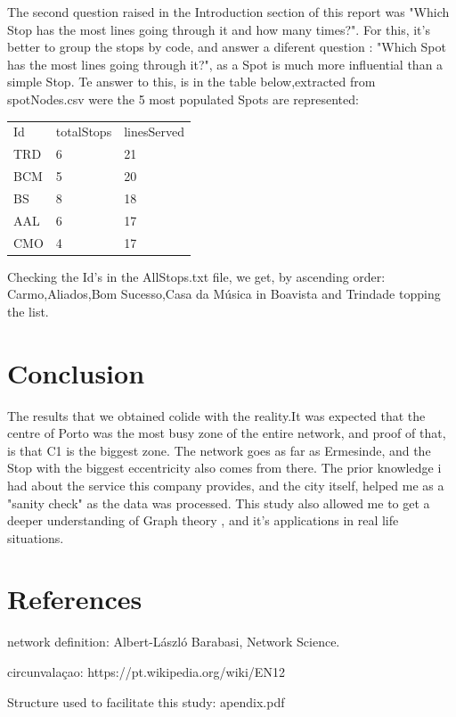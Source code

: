 \documentclass[12pt]{article}
\begin{document}
The second question raised in the Introduction section of this report was "Which Stop has the most lines going through it and how many times?". For this, it's better to group the stops by code, and answer a diferent question : "Which Spot has the most lines going through it?", as a Spot is much more influential than a simple Stop. Te answer to this, is in the table below,extracted from spotNodes.csv were the 5 most populated Spots are represented:

\begin{table}[]
\centering
\begin{tabular}{lll}
Id  & totalStops & linesServed \\
TRD & 6          & 21          \\
BCM & 5          & 20          \\
BS  & 8          & 18          \\
AAL & 6          & 17          \\
CMO & 4          & 17         
\end{tabular}
\end{table}

Checking the Id's in the AllStops.txt file, we get, by ascending order:
Carmo,Aliados,Bom Sucesso,Casa da Música in Boavista and Trindade topping the list.

\section{Conclusion}
	The results that we obtained colide with the reality.It was expected that the centre of Porto was the most busy zone of the entire network, and proof of that, is that C1 is the biggest zone. The network goes as far as Ermesinde, and the Stop with the biggest eccentricity also comes from there. The prior knowledge i had about the service this company provides, and the city itself, helped me as a "sanity check" as the data was processed. This study also allowed me to get a deeper understanding of Graph theory , and it's applications in real life situations.
\section{References}

network definition:
Albert-László Barabasi, Network Science.

circunvalaçao:
https://pt.wikipedia.org/wiki/EN12	

Structure used to facilitate this study:
apendix.pdf
			
\end{document}
